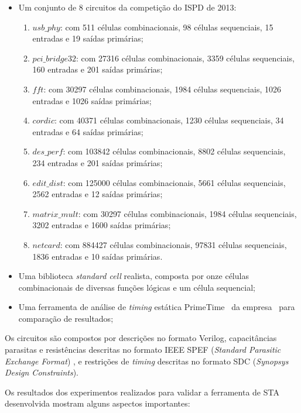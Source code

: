 \documentclass[
	12pt,				%
	openright,			%
	twoside,			%
	a4paper,			%
	english,			%
	french,				%
	spanish,			%
	brazil,				%
	]{abntex2}
\begin{document}
\begin{itemize}

\item Um conjunto de 8 circuitos da competição do ISPD de 2013:
	\begin{enumerate}
	\item \textbf{$usb\_phy$}: com 511 células combinacionais, 98 células sequenciais, 15 entradas e 19 saídas primárias;
	\item \textbf{$pci\_bridge32$}: com 27316 células combinacionais, 3359 células sequenciais, 160 entradas e 201 saídas primárias;
	\item \textbf{$fft$}: com 30297 células combinacionais, 1984 células sequenciais, 1026 entradas e 1026 saídas primárias;
	\item \textbf{$cordic$}: com 40371 células combinacionais, 1230 células sequenciais, 34 entradas e 64 saídas primárias;
	\item \textbf{$des\_perf$}: com 103842 células combinacionais, 8802 células sequenciais, 234 entradas e 201 saídas primárias;
	\item \textbf{$edit\_dist$}: com 125000 células combinacionais, 5661 células sequenciais, 2562 entradas e 12 saídas primárias;
	\item \textbf{$matrix\_mult$}: com 30297 células combinacionais, 1984 células sequenciais, 3202 entradas e 1600 saídas primárias;
	\item \textbf{$netcard$}: com 884427 células combinacionais, 97831 células sequenciais, 1836 entradas e 10 saídas primárias.
	\end{enumerate}

\item Uma biblioteca \textit{standard cell} realista, composta por onze células combinacionais de diversas funções lógicas e um célula sequencial;

\item Uma ferramenta de análise de \textit{timing} estática PrimeTime \texttrademark \ da empresa  \textregistered \ para comparação de resultados;
\end{itemize}

Os circuitos são compostos por descrições no formato Verilog, capacitâncias parasitas e resistências descritas no formato IEEE SPEF (\textit{Standard Parasitic Exchange Format}) \cite{IEEE99}, e restrições de \textit{timing} descritas no formato SDC (\textit{Synopsys Design Constraints}).

Os resultados dos experimentos realizados para validar a ferramenta de STA desenvolvida mostram alguns aspectos importantes:
\end{document}
